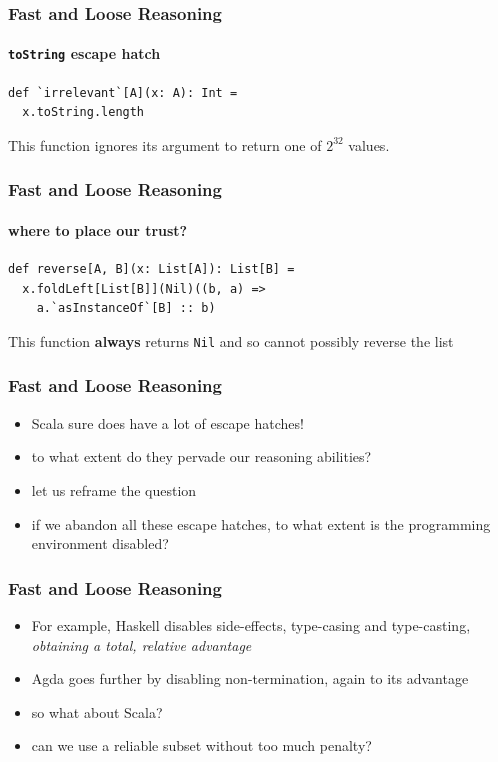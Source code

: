 \begin{frame}[fragile]
\frametitle{Fast and Loose Reasoning}
\framesubtitle{\lstinline{toString} escape hatch}
\begin{lstlisting}[style=scala]
def `irrelevant`[A](x: A): Int =
  x.toString.length
\end{lstlisting}
\begin{theorem}This function ignores its argument to return one of {${2^{32}}$} values. \end{theorem}
\end{frame}

\begin{frame}[fragile]
\frametitle{Fast and Loose Reasoning}
\framesubtitle{where to place our trust?}
\begin{lstlisting}[style=scala]
def reverse[A, B](x: List[A]): List[B] = 
  x.foldLeft[List[B]](Nil)((b, a) =>
    a.`asInstanceOf`[B] :: b)
\end{lstlisting}
\begin{theorem}This function \textbf{always} returns \lstinline{Nil} and so cannot possibly reverse the list\end{theorem}
\end{frame}

\begin{frame}[fragile]
\frametitle{Fast and Loose Reasoning}
\begin{itemize}
  \item Scala sure does have a lot of escape hatches!
  \item to what extent do they pervade our reasoning abilities?
  \item let us reframe the question
  \item if we abandon all these escape hatches, to what extent is the programming environment disabled?
\end{itemize}
\end{frame}

\begin{frame}[fragile]
\frametitle{Fast and Loose Reasoning}
\begin{itemize}
  \item For example, Haskell disables side-effects, type-casing and type-casting, \emph{obtaining a total, relative advantage}
  \item Agda goes further by disabling non-termination, again to its advantage
  \item so what about Scala?
  \item can we use a reliable subset without too much penalty?
\end{itemize}
\end{frame}

